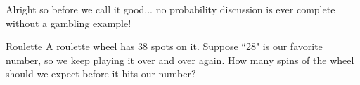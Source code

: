 Alright so before we call it good... no probability discussion is ever complete without a gambling example! 

\begin{exercise}{Roulette \Coffeecup \Coffeecup}
 A roulette wheel has 38 spots on it.  Suppose ``28" is our favorite number, so we keep playing it over and over again.  How many spins of the wheel should we expect before it hits our number?
\vspace*{2in}
\end{exercise}

